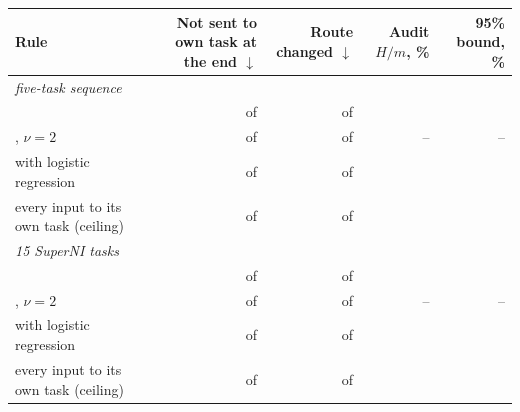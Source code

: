 {\footnotesize\setlength{\tabcolsep}{3pt}\begin{tabular}{lrrrr}
    \toprule
    Rule & \shortstack[r]{Not sent\\to own task\\at the end $\downarrow$} & \shortstack[r]{Route\\changed $\downarrow$} & \shortstack[r]{Audit\\$H/m$, \%} & \shortstack[r]{95\% bound,\\\%} \\
    \midrule
    \multicolumn{5}{l}{\textit{five-task sequence}} \\
    \recog{} & \AudRouteFiveRidgeNotOwn{} of \AudRouteFiveRidgeN{} & \AudRouteFiveRidgeChanged{} of \AudRouteFiveRidgeCompared{} & \AudRouteFiveRidgeAuditEst{} & \AudRouteFiveRidgeAuditBound{} \\
    \handicap{}, $\nu = 2$ & \AudRouteFiveHandicapNotOwn{} of \AudRouteFiveHandicapN{} & \AudRouteFiveHandicapChanged{} of \AudRouteFiveHandicapCompared{} & -- & -- \\
    \recog{} with logistic regression & \AudRouteFiveJointNotOwn{} of \AudRouteFiveJointN{} & \AudRouteFiveJointChanged{} of \AudRouteFiveJointCompared{} & \AudRouteFiveJointAuditEst{} & \AudRouteFiveJointAuditBound{} \\
    every input to its own task (ceiling) & \AudRouteFiveOwnNotOwn{} of \AudRouteFiveOwnN{} & \AudRouteFiveOwnChanged{} of \AudRouteFiveOwnCompared{} & \AudRouteFiveOwnAuditEst{} & \AudRouteFiveOwnAuditBound{} \\
    \midrule
    \multicolumn{5}{l}{\textit{15 SuperNI tasks}} \\
    \recog{} & \AudRouteFifteenRidgeNotOwn{} of \AudRouteFifteenRidgeN{} & \AudRouteFifteenRidgeChanged{} of \AudRouteFifteenRidgeCompared{} & \AudRouteFifteenRidgeAuditEst{} & \AudRouteFifteenRidgeAuditBound{} \\
    \handicap{}, $\nu = 2$ & \AudRouteFifteenHandicapNotOwn{} of \AudRouteFifteenHandicapN{} & \AudRouteFifteenHandicapChanged{} of \AudRouteFifteenHandicapCompared{} & -- & -- \\
    \recog{} with logistic regression & \AudRouteFifteenJointNotOwn{} of \AudRouteFifteenJointN{} & \AudRouteFifteenJointChanged{} of \AudRouteFifteenJointCompared{} & \AudRouteFifteenJointAuditEst{} & \AudRouteFifteenJointAuditBound{} \\
    every input to its own task (ceiling) & \AudRouteFifteenOwnNotOwn{} of \AudRouteFifteenOwnN{} & \AudRouteFifteenOwnChanged{} of \AudRouteFifteenOwnCompared{} & \AudRouteFifteenOwnAuditEst{} & \AudRouteFifteenOwnAuditBound{} \\
    \bottomrule
\end{tabular}}
